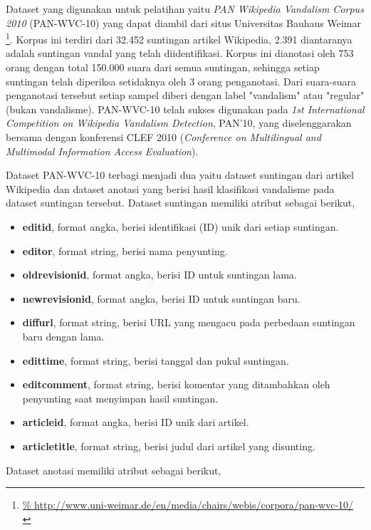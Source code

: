 Dataset yang digunakan untuk pelatihan yaitu \textit{PAN Wikipedia Vandalism
Corpus 2010} (PAN-WVC-10)
\cite{potthast:2010b}
yang dapat diambil dari situs Universitas Bauhaus Weimar
\footnote{%
	\RaggedRight\url{%
http://www.uni-weimar.de/en/media/chairs/webis/corpora/pan-wvc-10/
}}.
Korpus ini terdiri dari 32.452 suntingan artikel Wikipedia, 2.391 diantaranya
adalah suntingan vandal yang telah diidentifikasi.
Korpus ini dianotasi oleh 753 orang dengan total 150.000 suara dari semua
suntingan, sehingga setiap suntingan telah diperiksa setidaknya oleh 3 orang
penganotasi.
Dari suara-suara penganotasi tersebut setiap sampel diberi dengan label
"vandalism" atau "regular" (bukan vandalisme).
PAN-WVC-10 telah sukses digunakan pada \textit{1st International Competition on
Wikipedia Vandalism Detection}, PAN'10, yang diselenggarakan bersama dengan
konferensi CLEF 2010 (\textit{Conference on Multilingual and Multimodal
Information Access Evaluation}).

Dataset PAN-WVC-10 terbagi menjadi dua yaitu dataset suntingan dari artikel
Wikipedia dan dataset anotasi yang berisi hasil klasifikasi vandalisme pada
dataset suntingan tersebut.
Dataset suntingan memiliki atribut sebagai berikut,

\begin{itemize}
	\item \textbf{editid}, format angka, berisi identifikasi (ID) unik dari setiap suntingan.
	\item \textbf{editor}, format string, berisi nama penyunting.
	\item \textbf{oldrevisionid}, format angka, berisi ID untuk suntingan lama.
	\item \textbf{newrevisionid}, format angka, berisi ID untuk suntingan baru.
	\item \textbf{diffurl}, format string, berisi URL yang mengacu pada perbedaan suntingan baru dengan lama.
	\item \textbf{edittime}, format string, berisi tanggal dan pukul
	suntingan.
	\item \textbf{editcomment}, format string, berisi komentar yang ditambahkan oleh penyunting saat menyimpan hasil suntingan.
	\item \textbf{articleid}, format angka, berisi ID unik dari artikel.
	\item \textbf{articletitle}, format string, berisi judul dari artikel yang disunting.
\end{itemize}

Dataset anotasi memiliki atribut sebagai berikut,

